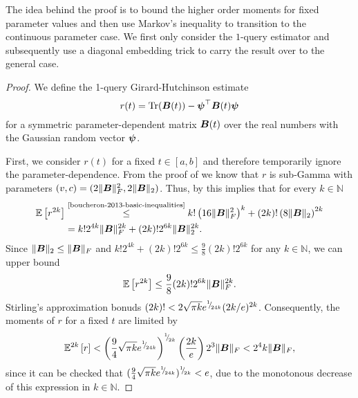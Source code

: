 \documentclass[12pt]{article}
\begin{document}
The idea behind the proof is to bound the higher order moments for fixed parameter values and then use Markov's inequality to transition to the continuous parameter case. We first only consider the $1$-query estimator and subsequently use a diagonal embedding trick to carry the result over to the general case.
\begin{proof} 
    We define the 1-query Girard-Hutchinson estimate 
    \begin{equation}
        r(t) = \operatorname{Tr}(\boldsymbol{B}(t)) - \boldsymbol{\psi}^{\top} \boldsymbol{B}(t) \boldsymbol{\psi}
    \end{equation}
    for a symmetric parameter-dependent matrix $\boldsymbol{B}(t)$ over the real numbers with the Gaussian random vector $\boldsymbol{\psi}$.

    First, we consider $r(t)$ for a fixed $t \in [a,b]$ and therefore temporarily ignore the parameter-dependence. From the proof of \cite[lemma 3]{cortinovis-2022-randomized-trace} we know that $r$ is sub-Gamma with parameters $(v, c) = (2 \lVert \boldsymbol{B} \rVert _F^2, 2 \lVert \boldsymbol{B} \rVert _2)$. Thus, by \cite[theorem 2.3]{boucheron-2013-basic-inequalities} this implies that for every $k \in \mathbb{N}$
    \begin{align}
        \mathbb{E}\left[ r^{2 k} \right]
        &\stackrel{\text{\cite{boucheron-2013-basic-inequalities}}}{\leq} k! \left( 16 \lVert \mtx{B} \rVert _F^2 \right)^k + (2 k)! \left( 8 \lVert \mtx{B} \rVert _2 \right)^{2 k} \notag \\
        &= k! 2^{4 k} \lVert \mtx{B} \rVert _F^{2 k} + (2 k)! 2^{6 k} \lVert \mtx{B} \rVert _2^{2 k}.
    \end{align}
    Since $\lVert \boldsymbol{B} \rVert _2 \leq \lVert \boldsymbol{B} \rVert _F$ and $k! 2^{4 k} + (2 k)! 2^{6 k} \leq \frac{9}{8}(2 k)! 2^{6 k}$ for any $k \in \mathbb{N}$, we can upper bound 
    \begin{equation}
        \mathbb{E}\left[ r^{2 k} \right] \leq \frac{9}{8} (2 k)! 2^{6 k} \lVert \boldsymbol{B} \rVert _F^{2k}.
    \end{equation}
    Stirling's approximation \cite{robbins-1955-remark-stirling} bonuds $(2 k)! < 2 \sqrt{\pi k}  e^{{}^{1}{\mskip -5mu/\mskip -3mu}_{24 k}} ( 2 k / e )^{2 k}$. Consequently, the moments of $r$ for a fixed $t$ are limited by
    \begin{equation}
        \mathbb{E}^{2k}\left[ r \right]
        < \left( \frac{9}{4} \sqrt{\pi k} e^{{}^{1}{\mskip -5mu/\mskip -3mu}_{24 k}} \right)^{{}^{1}{\mskip -5mu/\mskip -3mu}_{2k}} \left( \frac{2 k}{e}\right) 2^{3} \lVert \boldsymbol{B} \rVert _F < 2^4 k \lVert \boldsymbol{B} \rVert _F,
        \label{equ:hutchinson-trace-onequery-fixed}
    \end{equation}
    since it can be checked that $(\frac{9}{4} \sqrt{\pi k} e^{{}^{1}{\mskip -5mu/\mskip -3mu}_{24 k}})^{{}^{1}{\mskip -5mu/\mskip -3mu}_{2k}} < e$, due to the monotonous decrease of this expression in $k \in \mathbb{N}$.


\end{proof}
\end{document}

